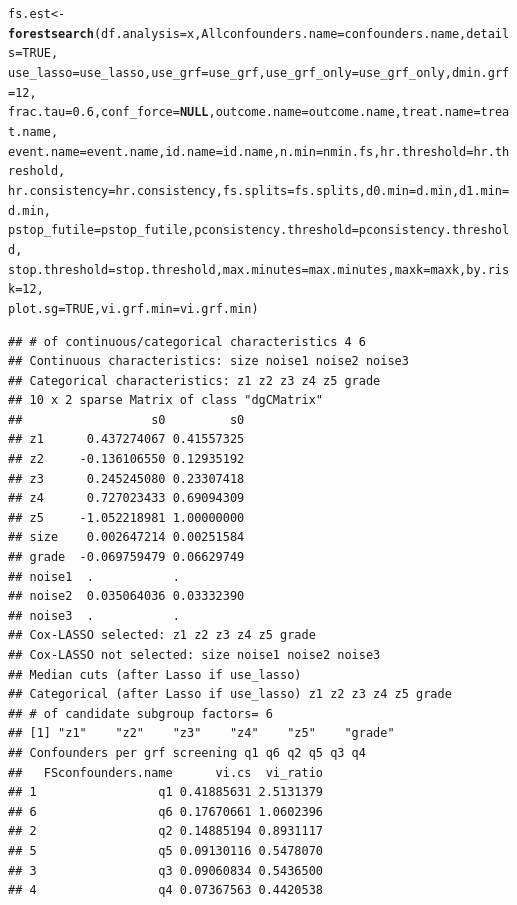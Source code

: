 \documentclass[smallextended]{svjour3}
\makeatletter
\newcommand{\hlnum}[1]{\textcolor[rgb]{0.686,0.059,0.569}{#1}}%
\newcommand{\hlstd}[1]{\textcolor[rgb]{0.345,0.345,0.345}{#1}}%
\newcommand{\hlkwa}[1]{\textcolor[rgb]{0.161,0.373,0.58}{\textbf{#1}}}%
\newcommand{\hlkwb}[1]{\textcolor[rgb]{0.69,0.353,0.396}{#1}}%
\newcommand{\hlkwc}[1]{\textcolor[rgb]{0.333,0.667,0.333}{#1}}%
\newcommand{\hlkwd}[1]{\textcolor[rgb]{0.737,0.353,0.396}{\textbf{#1}}}%
\newenvironment{kframe}{%
 \def\at@end@of@kframe{}%
 \ifinner\ifhmode%
  \def\at@end@of@kframe{\end{minipage}}%
  \begin{minipage}{\columnwidth}%
 \fi\fi%
 \def\FrameCommand##1{\hskip\@totalleftmargin \hskip-\fboxsep
 \colorbox{shadecolor}{##1}\hskip-\fboxsep
     \hskip-\linewidth \hskip-\@totalleftmargin \hskip\columnwidth}%
 \MakeFramed {\advance\hsize-\width
   \@totalleftmargin\z@ \linewidth\hsize
   \@setminipage}}%
 {\par\unskip\endMakeFramed%
 \at@end@of@kframe}
\newenvironment{knitrout}{}{} %
\makeatother
\begin{document}
\begin{knitrout}
\begin{kframe}
\begin{alltt}
\hlstd{fs.est} \hlkwb{<-} \hlkwd{forestsearch}\hlstd{(}\hlkwc{df.analysis} \hlstd{= x,} \hlkwc{Allconfounders.name} \hlstd{= confounders.name,} \hlkwc{details} \hlstd{=} \hlnum{TRUE}\hlstd{,}
    \hlkwc{use_lasso} \hlstd{= use_lasso,} \hlkwc{use_grf} \hlstd{= use_grf,} \hlkwc{use_grf_only} \hlstd{= use_grf_only,} \hlkwc{dmin.grf} \hlstd{=} \hlnum{12}\hlstd{,}
    \hlkwc{frac.tau} \hlstd{=} \hlnum{0.6}\hlstd{,} \hlkwc{conf_force} \hlstd{=} \hlkwa{NULL}\hlstd{,} \hlkwc{outcome.name} \hlstd{= outcome.name,} \hlkwc{treat.name} \hlstd{= treat.name,}
    \hlkwc{event.name} \hlstd{= event.name,} \hlkwc{id.name} \hlstd{= id.name,} \hlkwc{n.min} \hlstd{= nmin.fs,} \hlkwc{hr.threshold} \hlstd{= hr.threshold,}
    \hlkwc{hr.consistency} \hlstd{= hr.consistency,} \hlkwc{fs.splits} \hlstd{= fs.splits,} \hlkwc{d0.min} \hlstd{= d.min,} \hlkwc{d1.min} \hlstd{= d.min,}
    \hlkwc{pstop_futile} \hlstd{= pstop_futile,} \hlkwc{pconsistency.threshold} \hlstd{= pconsistency.threshold,}
    \hlkwc{stop.threshold} \hlstd{= stop.threshold,} \hlkwc{max.minutes} \hlstd{= max.minutes,} \hlkwc{maxk} \hlstd{= maxk,} \hlkwc{by.risk} \hlstd{=} \hlnum{12}\hlstd{,}
    \hlkwc{plot.sg} \hlstd{=} \hlnum{TRUE}\hlstd{,} \hlkwc{vi.grf.min} \hlstd{= vi.grf.min)}
\end{alltt}
\begin{verbatim}
## # of continuous/categorical characteristics 4 6 
## Continuous characteristics: size noise1 noise2 noise3 
## Categorical characteristics: z1 z2 z3 z4 z5 grade 
## 10 x 2 sparse Matrix of class "dgCMatrix"
##                  s0         s0
## z1      0.437274067 0.41557325
## z2     -0.136106550 0.12935192
## z3      0.245245080 0.23307418
## z4      0.727023433 0.69094309
## z5     -1.052218981 1.00000000
## size    0.002647214 0.00251584
## grade  -0.069759479 0.06629749
## noise1  .           .         
## noise2  0.035064036 0.03332390
## noise3  .           .         
## Cox-LASSO selected: z1 z2 z3 z4 z5 grade 
## Cox-LASSO not selected: size noise1 noise2 noise3 
## Median cuts (after Lasso if use_lasso) 
## Categorical (after Lasso if use_lasso) z1 z2 z3 z4 z5 grade 
## # of candidate subgroup factors= 6 
## [1] "z1"    "z2"    "z3"    "z4"    "z5"    "grade"
## Confounders per grf screening q1 q6 q2 q5 q3 q4 
##   FSconfounders.name      vi.cs  vi_ratio
## 1                 q1 0.41885631 2.5131379
## 6                 q6 0.17670661 1.0602396
## 2                 q2 0.14885194 0.8931117
## 5                 q5 0.09130116 0.5478070
## 3                 q3 0.09060834 0.5436500
## 4                 q4 0.07367563 0.4420538

\end{verbatim}
\end{kframe}
\end{knitrout}
\end{document}
